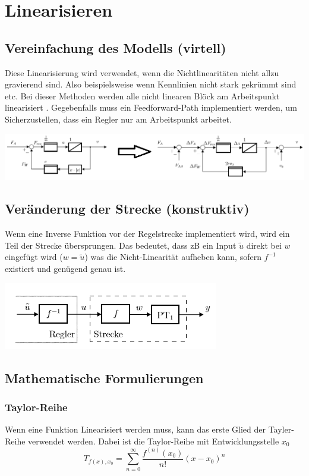 \section{Linearisieren}
\subsection{Vereinfachung des Modells (virtell)}
Diese Linearisierung wird verwendet, wenn die Nichtlinearitäten nicht allzu gravierend sind. Also beispielsweise wenn Kennlinien nicht stark gekrümmt sind etc. Bei dieser Methoden werden alle nicht linearen Blöck am Arbeitspunkt linearisiert . Gegebenfalls muss ein Feedforward-Path implementiert werden, um Sicherzustellen, dass ein Regler nur am Arbeitspunkt arbeitet.
\begin{center}
	\includegraphics[width=\columnwidth]{Images/virtuell_linearisierung}
\end{center}


\subsection{Veränderung der Strecke (konstruktiv)}
Wenn eine Inverse Funktion vor der Regelstrecke implementiert wird, wird ein Teil der Strecke übersprungen. Das bedeutet, dass zB ein Input $\tilde{u}$ direkt bei $w$ eingefügt wird ($w = \tilde{u}$) was die Nicht-Linearität aufheben kann, sofern $f^{-1}$ existiert und genügend genau ist.
\begin{center}
	\includegraphics[width=0.6\columnwidth]{Images/konstruktiv_linearisierung}
\end{center}


\subsection{Mathematische Formulierungen}
\subsubsection{Taylor-Reihe}
Wenn eine Funktion Linearisiert werden muss, kann das erste Glied der Tayler-Reihe verwendet werden. Dabei ist die Taylor-Reihe mit Entwicklungsstelle $x_0$
\[
T_{f(x),x_0} = \sum_{n=0}^{\infty}\frac{f^{(n)}(x_0)}{n!}(x-x_0)^n
\]

